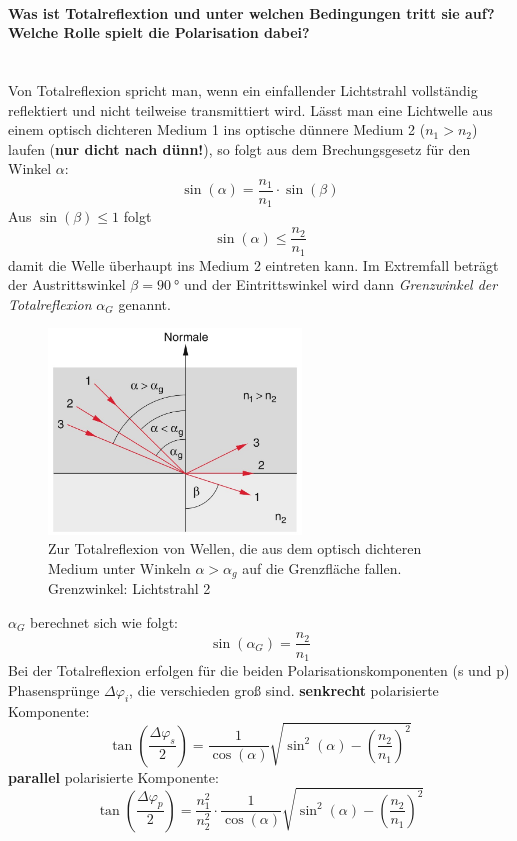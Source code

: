 \documentclass[a4paper, 11pt, ngerman, parskip=half-]{scrartcl}
\newcommand{\myparagraph}[1]{\paragraph{#1}\mbox{}\\}
\begin{document}
\myparagraph{Was ist Totalreflextion und unter welchen Bedingungen tritt sie auf? Welche Rolle spielt die Polarisation dabei?}
%
%
Von Totalreflexion spricht man, wenn ein einfallender Lichtstrahl vollständig reflektiert und nicht teilweise transmittiert wird.
Lässt man eine Lichtwelle aus einem optisch dichteren Medium 1 ins optische dünnere Medium 2 ($n_1 > n_2$) laufen (\textbf{nur dicht nach dünn!}), so folgt aus dem Brechungsgesetz für den Winkel $\alpha$:
%
\[\sin(\alpha) = \frac{n_1}{n_1} \cdot \sin(\beta)\]
%
Aus $\sin(\beta) \leq 1$ folgt
%
\[\sin(\alpha) \leq \frac{n_2}{n_1}\]
%
damit die Welle überhaupt ins Medium 2 eintreten kann. Im Extremfall beträgt der Austrittswinkel $\beta = \SI{90}{\degree}$ und der Eintrittswinkel wird dann \textit{Grenzwinkel der Totalreflexion} $\alpha_G$ genannt.
%
\begin{figure}[H]
    \centering
    \begin{samepage}
        \includegraphics[width=0.6\textwidth]{image/15/totalreflexion.jpg}
        \caption{Zur Totalreflexion von Wellen, die aus dem optisch
        dichteren Medium unter Winkeln $\alpha > \alpha_g$ auf die Grenzfläche fallen. Grenzwinkel: Lichtstrahl 2}
        \label{fig:totalreflexion}
    \end{samepage}
\end{figure}
%
$\alpha_G$ berechnet sich wie folgt:
\begin{equation}
    \label{eq:grenzwinkel_totalreflexion}
    \sin(\alpha_G) = \frac{n_2}{n_1}
\end{equation}
%
Bei der Totalreflexion erfolgen für die beiden Polarisationskomponenten (s und p) Phasensprünge $\Delta \varphi_i$, die verschieden groß sind.
%
\textbf{senkrecht} polarisierte Komponente:
%
\begin{equation}
    \label{eq:totalreflexion_s_polarisation}
    \tan(\frac{\Delta \varphi_s}{2}) = \frac{1}{\cos(\alpha)} \sqrt{\sin^2(\alpha) - \left(\frac{n_2}{n_1}\right)^2}
\end{equation}
%
\textbf{parallel} polarisierte Komponente:
%
\begin{equation}
    \label{eq:totalreflexion_p_polarisation}
    \tan(\frac{\Delta \varphi_p}{2}) = \frac{n_1^2}{n_2^2} \cdot \frac{1}{\cos(\alpha)} \sqrt{\sin^2(\alpha) - \left(\frac{n_2}{n_1}\right)^2}
\end{equation}
\end{document}
